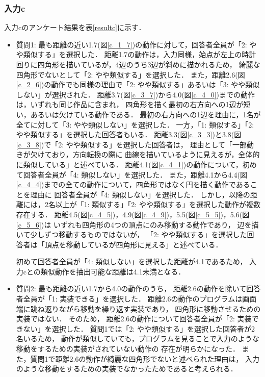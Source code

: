 \documentclass[11pt]{jreport}
\begin{document}
\subsubsection{入力c}
入力cのアンケート結果を表\ref{resultc}に示す．

\begin{itemize}
    \item 質問1: 最も距離の近い1.7(図\ref{c_1_7})の動作に対して，回答者全員が「2: やや類似する」を選択した．
    距離1.7の動作は，入力同様，始点が左上の時計回りに四角形を描いているが，4辺のうち3辺が斜めに描かれるため，
    綺麗な四角形でないとして「2: やや類似する」を選択した．
    また，距離2.6(図\ref{c_2_6})の動作でも同様の理由で「2: やや類似する」あるいは「3: やや類似しない」が選択された．
    距離3.7(図\ref{c_3_7})から4.0(図\ref{c_4_0})までの動作は，いずれも同じ作品に含まれ，
    四角形を描く最初の右方向への1辺が短い，あるいは欠けている動作である．
    最初の右方向への1辺を理由に，1名が全てに対して「3: やや類似しない」を選択した．
    一方，「1: 類似する」「2: やや類似する」を選択した回答者もいる．
    距離3.3(図\ref{c_3_3})と3.8(図\ref{c_3_8})で「2: やや類似する」を選択した回答者は，
    理由として「一部動きが欠けており，方向転換の際に
    曲線を描いているように見えるが，全体的に類似している」と述べている．
    距離4.1(図\ref{c_4_1})の動作について，初めて回答者全員が「4: 類似しない」を選択した．
    また，距離4.1から4.4(図\ref{c_4_4})までの全ての動作について，四角形ではなく円を描く動作であることを理由に
    回答者全員が「4: 類似しない」を選択した．
    しかし，以降の距離には，2名以上が「1: 類似する」「2: やや類似する」を選択した動作が複数存在する．
    距離4.5(図\ref{c_4_5})，4.9(図\ref{c_4_9})，5.5(図\ref{c_5_5})，5.6(図\ref{c_5_6})は
    いずれも四角形の4つの頂点にのみ移動する動作であり，
    辺を描いて少しずつ移動するものではないが，
    「2: やや類似する」を選択した回答者は「頂点を移動しているが四角形に見える」と述べている．
    
    初めて回答者全員が「4: 類似しない」を選択した距離が4.1であるため，
    入力cとの類似動作を抽出可能な距離は4.1未満となる．
    
    \item 質問2: 最も距離の近い1.7から4.0の動作のうち，
    距離2.6の動作を除いて回答者全員が「1: 実装できる」を選択した．
    距離2.6の動作のプログラムは画面端に跳ね返りながら移動を繰り返す実装であり，
    四角形に移動させるための実装ではない．
    そのため， 距離2.6の動作について回答者全員が「2: 実装できない」を選択した．
    質問1では「2: やや類似する」を選択した回答者が2名いるため，
    動作が類似していても，プログラムを見ることで入力のような移動をするための実装がされていない動作の
    存在が明らかになった．
    また，質問1で距離2.6の動作が綺麗な四角形でないと述べられた理由は，
    入力のような移動をするための実装でなかったためであると考えられる．
\end{itemize}
\end{document}
